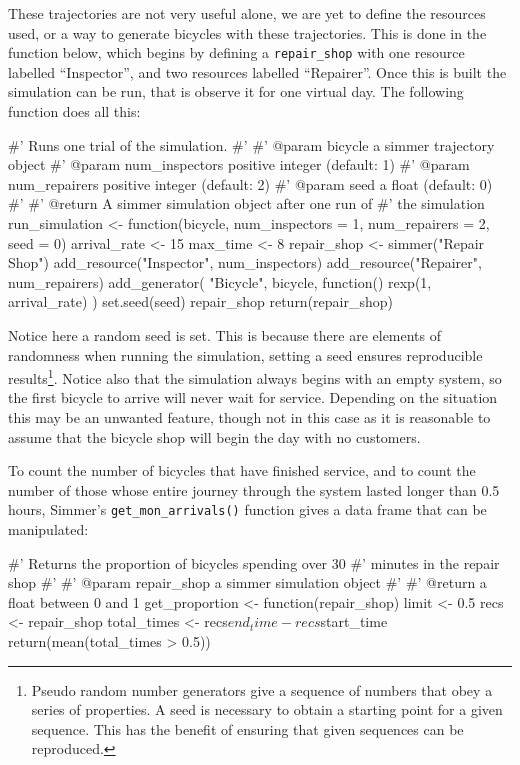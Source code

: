 These trajectories are not very useful alone, we are yet to define the resources
used, or a way to generate bicycles with these trajectories. This is done in the
function below, which begins by defining a \texttt{repair_shop} with one
resource labelled ``Inspector'', and two resources labelled ``Repairer''.
Once this is built the simulation can be run, that is observe it for one
virtual day. The following function does all this:

\begin{Rin}
#' Runs one trial of the simulation.
#'
#' @param bicycle a simmer trajectory object
#' @param num_inspectors positive integer (default: 1)
#' @param num_repairers positive integer (default: 2)
#' @param seed a float (default: 0)
#'
#' @return A simmer simulation object after one run of
#'         the simulation
run_simulation <- function(bicycle,
                           num_inspectors = 1,
                           num_repairers = 2,
                           seed = 0) {
  arrival_rate <- 15
  max_time <- 8
  repair_shop <-
    simmer("Repair Shop") %
    add_resource("Inspector", num_inspectors) %
    add_resource("Repairer", num_repairers) %
    add_generator(
      "Bicycle", bicycle, function() {
        rexp(1, arrival_rate)
      }
    )
  set.seed(seed)
  repair_shop %
  return(repair_shop)
}
\end{Rin}

Notice here a random seed is set. This is because there are elements of
randomness when running the simulation, setting a seed ensures reproducible
results\footnote{
Pseudo random number generators give a sequence of numbers that obey a series of
properties. A seed is necessary to obtain a starting point for a given sequence.
This has the benefit of ensuring that given sequences can be reproduced.
}.
Notice also that the simulation always begins with an empty system, so the first
bicycle to arrive will never wait for service. Depending on the situation this
may be an unwanted feature, though not in this case as it is reasonable to
assume that the bicycle shop will begin the day with no customers.

To count the number of bicycles that have finished service, and to
count the number of those whose entire journey through the system lasted longer
than 0.5 hours, Simmer's \texttt{get_mon_arrivals()} function gives a
data frame that can be manipulated:

\begin{Rin}
#' Returns the proportion of bicycles spending over 30
#' minutes in the repair shop
#'
#' @param repair_shop a simmer simulation object
#'
#' @return a float between 0 and 1
get_proportion <- function(repair_shop) {
  limit <- 0.5
  recs <- repair_shop %
  total_times <- recs$end_time - recs$start_time
  return(mean(total_times > 0.5))
}
\end{Rin}

